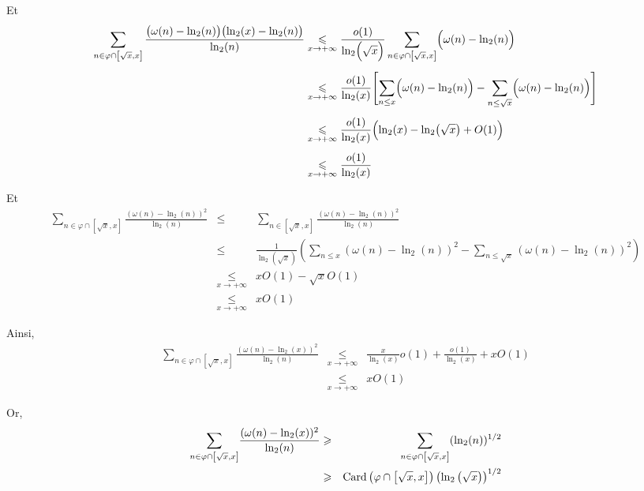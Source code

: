 Et
\begin{align*}
\sum_{\substack{n \in \varphi \cap \left[\sqrt{x}, x\right]}}
\frac{\bigl(\omega(n) - \ln_2(n)\bigr)\bigl(\ln_2(x) - \ln_2(n)\bigr)}{\ln_2(n)}
&\underset{x \rightarrow + \infty}{\leqslant} 
\frac{o(1)}{\ln_2\Bigl(\sqrt{x}\Bigr)}
\sum_{\substack{n \in \varphi \cap \left[\sqrt{x}, x\right]}}
\Bigl( \omega(n) - \ln_2(n) \Bigr) \\[1ex]
&\underset{x \rightarrow + \infty}{\leqslant} 
\frac{o(1)}{\ln_2(x)}\Biggl[
\sum_{n \leq x} \Bigl(\omega(n) - \ln_2(n)\Bigr)
- \sum_{n \leq \sqrt{x}} \Bigl(\omega(n) - \ln_2(n)\Bigr)
\Biggr] \\[1ex]
&\underset{x \rightarrow + \infty}{\leqslant} 
\frac{o(1)}{\ln_2(x)}
\Bigl( \ln_2(x) - \ln_2\bigl(\sqrt{x}\bigr) + O(1) \Bigr) \\[1ex]
&\underset{x \rightarrow + \infty}{\leqslant} 
\frac{o(1)}{\ln_2(x)}
\end{align*}


Et
\begin{eqnarray*}
  \underset{n \in \varphi \cap \left[ \sqrt{x}, x \right]}{\sum} \frac{(\omega
  (n) - \ln_2 (n))^2}{\ln_2 (n)} & \leqslant & \underset{n \in \left[
  \sqrt{x}, x \right]}{\sum} \frac{(\omega (n) - \ln_2 (n))^2}{\ln_2 (n)}\\
  & \leqslant & \frac{1}{\ln_2 \left( \sqrt{x} \right)} \left( \underset{n
  \leqslant x}{\sum} (\omega (n) - \ln_2 (n))^2 - \underset{n \leqslant
  \sqrt{x}}{\sum} (\omega (n) - \ln_2 (n))^2 \right)\\
  & \underset{x \rightarrow + \infty}{\leqslant} & x O (1) - \sqrt{x} O (1)\\
  & \underset{x \rightarrow + \infty}{\leqslant} & x O (1)
\end{eqnarray*}


Ainsi,
\begin{eqnarray*}
  \underset{n \in \varphi \cap \left[ \sqrt{x}, x \right]}{\sum} \frac{(\omega
  (n) - \ln_2 (x))^2}{\ln_2 (n)} & \underset{x \rightarrow +
  \infty}{\leqslant} & \frac{x}{\ln_2 (x)} o (1) + \frac{o (1)}{\ln_2 (x)} + x
  O (1)\\
  & \underset{x \rightarrow + \infty}{\leqslant} & x O (1)
\end{eqnarray*}


Or,
\begin{eqnarray*}
  \underset{n \in \varphi \cap \left[ \sqrt{x}, x \right]}{\sum} \frac{(\omega
  (n) - \ln_2 (x))^2}{\ln_2 (n)} & \geqslant & \underset{n \in \varphi \cap
  \left[ \sqrt{x}, x \right]}{\sum} (\ln_2 (n))^{1 / 2}\\
  & \geqslant & \operatorname{Card} \left( \varphi \cap \left[ \sqrt{x}, x \right]
  \right) \left( \ln_2 \left( \sqrt{x} \right) \right)^{1 / 2}
\end{eqnarray*}


